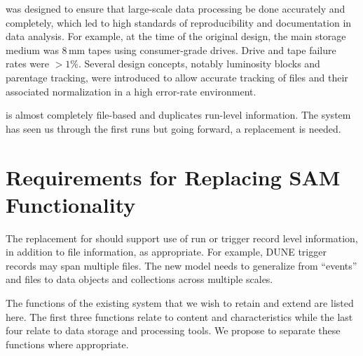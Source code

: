 \documentclass[../main-v1.tex]{subfiles}
\begin{document}
 was designed to ensure that large-scale data processing be done accurately and completely,  which led to  high standards of reproducibility and documentation in data analysis.
For example, at the time of the original design, the main storage medium was 8\,mm tapes using consumer-grade drives.  Drive and tape failure rates were $>1$\%.  Several  design concepts, notably luminosity blocks and parentage tracking, were introduced to allow accurate tracking of files and their associated normalization in a high error-rate environment. 

 is almost completely file-based and duplicates run-level information.  The %
system has seen us through the first  runs but going forward, a replacement is needed. %

\section{Requirements for Replacing SAM Functionality }




 The replacement for  should support use of run or trigger record level information, in addition to file information,  as appropriate. 
For example,  DUNE trigger records may span multiple files. The new model needs to generalize from ``events'' and files to data objects and collections across multiple scales. 

The functions of the existing  system that we wish to retain and extend are listed here. The first three functions %
relate to content and characteristics while the last four relate to data storage and processing tools.  We propose to separate these functions where appropriate.
\end{document}
